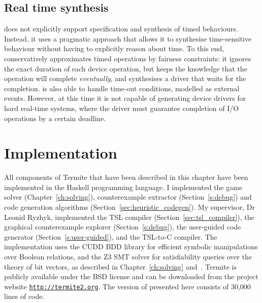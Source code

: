 \subsection{Real time synthesis}

\termite does not explicitly support specification and synthesis of timed behaviours.  Instead, it uses a pragmatic approach that allows it to synthesise time-sensitive behaviour without having to explicitly reason about time.  To this end, \termite conservatively approximates timed operations by fairness constraints: it ignores the exact duration of each device operation, but keeps the knowledge that the operation will complete \emph{eventually}, and synthesises a driver that waits for the completion.  \termite is also able to handle time-out conditions, modelled as external events.  However, at this time it is not capable of generating device drivers for hard real-time systems, where the driver must guarantee completion of I/O operations by a certain deadline.

\section{Implementation}

All components of Termite that have been described in this chapter have been implemented in the Haskell programming language. I implemented the game solver (Chapter~\ref{ch:solving}), counterexample extractor (Section~\ref{s:debug}) and code generation algorithms (Section~\ref{sec:heuristic_codegen}). My supervisor, Dr Leonid Ryzhyk, implemented the TSL compiler (Section~\ref{sec:tsl_compiler}), the graphical counterexample explorer (Section~\ref{s:debug}), the user-guided code generator (Section~\ref{s:user-guided}), and the TSL-to-C compiler.  The implementation uses the CUDD BDD library for efficient symbolic manipulations over Boolean relations, and the Z3 SMT solver for satisfiability queries over the theory of bit vectors, as described in Chapter~\ref{ch:solving} and~\cite{Walker_Ryzhyk_14}.  Termite is publicly available under the BSD license and can be downloaded from the project website \texttt{\url{http://termite2.org}}. The version of \termite presented here consists of 30,000 lines of code.  

